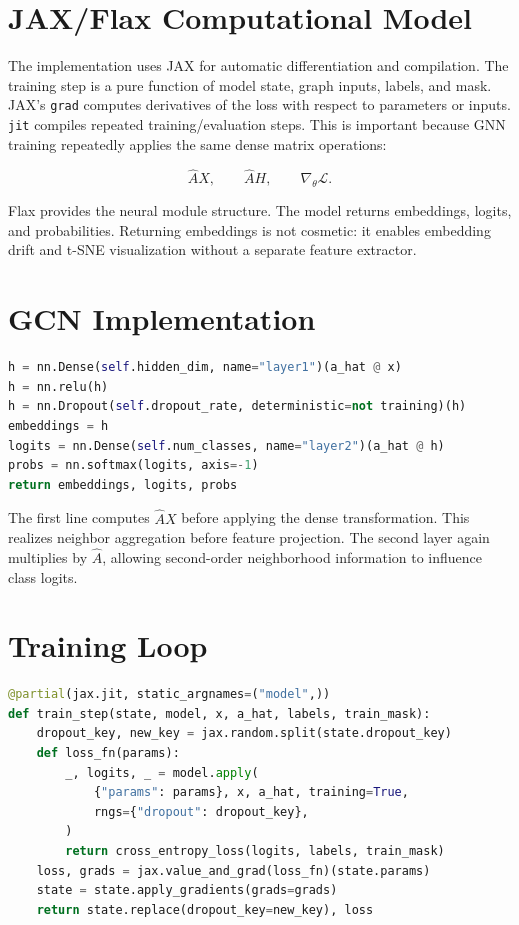 \documentclass[12pt,oneside]{report}
\begin{document}
\section{JAX/Flax Computational Model}
The implementation uses JAX for automatic differentiation and compilation. The training step is a pure function of model state, graph inputs, labels, and mask. JAX's \texttt{grad} computes derivatives of the loss with respect to parameters or inputs. \texttt{jit} compiles repeated training/evaluation steps. This is important because GNN training repeatedly applies the same dense matrix operations:

$$
\hat{A}X,\qquad \hat{A}H,\qquad \nabla_{\theta}\mathcal{L}.
$$

Flax provides the neural module structure. The model returns embeddings, logits, and probabilities. Returning embeddings is not cosmetic: it enables embedding drift and t-SNE visualization without a separate feature extractor.

\section{GCN Implementation}
\begin{lstlisting}[language=Python,caption={Two-layer GCN forward pass in models/gcn.py}]
h = nn.Dense(self.hidden_dim, name="layer1")(a_hat @ x)
h = nn.relu(h)
h = nn.Dropout(self.dropout_rate, deterministic=not training)(h)
embeddings = h
logits = nn.Dense(self.num_classes, name="layer2")(a_hat @ h)
probs = nn.softmax(logits, axis=-1)
return embeddings, logits, probs
\end{lstlisting}

The first line computes $\hat{A}X$ before applying the dense transformation. This realizes neighbor aggregation before feature projection. The second layer again multiplies by $\hat{A}$, allowing second-order neighborhood information to influence class logits.

\section{Training Loop}
\begin{lstlisting}[language=Python,caption={JIT-compiled train step in models/train.py}]
@partial(jax.jit, static_argnames=("model",))
def train_step(state, model, x, a_hat, labels, train_mask):
    dropout_key, new_key = jax.random.split(state.dropout_key)
    def loss_fn(params):
        _, logits, _ = model.apply(
            {"params": params}, x, a_hat, training=True,
            rngs={"dropout": dropout_key},
        )
        return cross_entropy_loss(logits, labels, train_mask)
    loss, grads = jax.value_and_grad(loss_fn)(state.params)
    state = state.apply_gradients(grads=grads)
    return state.replace(dropout_key=new_key), loss
\end{lstlisting}
\end{document}
